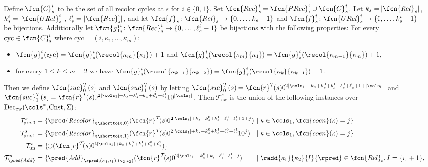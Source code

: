\begin{definition}
\begin{itemize}
\begin{align*}
		\end{align*}
		Define $\fcn{C}_{s}^{i}$ to be the set of all recolor cycles at $s$ for $i\in\{ 0, 1\}$. Set $\fcn{Rec}^{i}_{s} = \fcn{PRec}^{i}_s \cup  \fcn{C}_{s}^{i}$.
		Let $k_s = |\fcn{Rel}_s|$, $k_s^{i} = |\fcn{URel}^{i}_{s}|$, $\ell_s^{i} = |\fcn{Rec}_s^{i}|$, and let $\fcn{f}_s\colon \fcn{Rel}_{s} \to \{ 0,\ldots, k_s-1 \}$ and $\fcn{f}_s^{i}\colon \fcn{URel}_{s}^{i} \to \{ 0,\ldots, k_s^{i}-1 \}$ be bijections. Additionally let $\fcn{g}_s^{i}\colon \fcn{Rec}_{s}^{i} \to \{ 0,\ldots, \ell_s^{i}-1 \}$ be bijections with the following properties: For every $\mathrm{cyc}\in\fcn{C}^{i}_s$ where $\mathrm{cyc} = (i, \kappa_1, \ldots, \kappa_m)$:
		\begin{itemize}
			\item $\fcn{g}^{i}_{s}(\mathrm{cyc}) = \fcn{g}^{i}_{s}(\recol{\kappa_{m}}{\kappa_{1}}) + 1$ and $\fcn{g}^{i}_{s}(\recol{\kappa_{m}}{\kappa_{1}}) =  \fcn{g}^{i}_{s}(\recol{\kappa_{m-1}}{\kappa_{m}}) + 1$, 
			\item for every $1 \le k\le m-2$ we have $\fcn{g}^{i}_{s}(\recol{\kappa_{k+1}}{\kappa_{k+2}}) = \fcn{g}^{i}_{s}(\recol{\kappa_{k}}{\kappa_{k+1}}) + 1$.
		\end{itemize}
		Then we define $\fcn{suc}^{\mathcal{T}}_0(s)$ and $\fcn{suc}^{\mathcal{T}}_1(s)$ by letting $\fcn{suc}^{\mathcal{T}}_0(s) = \fcn{r}^{\mathcal{T}}\!(s)0^{2|\cols_1| +k_s+k_s^0+k_s^1+\ell_s^0+\ell_s^1+1 + |\cols_1|}$ and $\fcn{suc}^{\mathcal{T}}_1(s) = \fcn{r}^{\mathcal{T}}\!(s)0^{2|\cols_1| +k_s+k_s^0+k_s^1+\ell_s^0+\ell_s^1}10^{|\cols_1|}$. Then $\mathcal{T}_{\mathrm{cw}}^{s}$ is the union of the following instances over $\mathrm{Dec}_{\mathrm{cw}}(\cols^*, \mathrm{Cnst}, \Sigma)$:\small
		\begin{align*}
			\mathcal{T}_{\mathrm{pre}, 0}^{s} &=  \{ \pred{Recolor}_{\kappa \shortto (\kappa, 0)}(\fcn{r}^{\mathcal{T}}\!(s)0^{2|\cols_1| +k_s+k_s^0+k_s^1+\ell_s^0+\ell_s^1+1 + j}) \hspace{-3ex}&& \mid \kappa\in\cols_1, \fcn{coen}(\kappa) = j \} \\
			\mathcal{T}_{\mathrm{pre}, 1}^{s} &=  \{ \pred{Recolor}_{\kappa \shortto (\kappa, 1)}(\fcn{r}^{\mathcal{T}}\!(s)0^{2|\cols_1| + k_s+k_s^0+k_s^1+\ell_s^0+\ell_s^1}10^{j}) \!\! && \mid \kappa\in\cols_1, \fcn{coen}(\kappa) = j \} \\
			\mathcal{T}_{\mathrm{un}}^{s} & = \{ \oplus(\fcn{r}^{\mathcal{T}}\!(s)0^{2|\cols_1| +k_s+k_s^0+k_s^1+\ell_s^0+\ell_s^1}) \} &&\\
			\mathcal{T}_{\pred{Add}}^{s} &=  \{ \pred{Add}_{\rpred, (\kappa_1, i_1),(\kappa_2, i_2)}(\fcn{r}^{\mathcal{T}}\!(s)0^{2|\cols_1| + k_s^0+k_s^1+\ell_s^0+\ell_s^1+j}) &&\mid \radd{\kappa_1}{\kappa_2}{I}{\rpred}\in\fcn{Rel}_{s},I = \{i_1 +1 \}, \\[-1ex]

\end{align*}
\end{itemize}
\end{definition}
